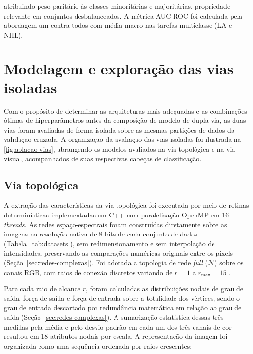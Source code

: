 atribuindo peso paritário às classes minoritárias e majoritárias, propriedade relevante em conjuntos desbalanceados. A métrica AUC-ROC foi calculada pela abordagem um-contra-todos com média macro nas tarefas multiclasse (LA e NHL).

\section{Modelagem e exploração das vias isoladas}
\label{sec:vias-isoladas}

Com o propósito de determinar as arquiteturas mais adequadas e as combinações ótimas de hiperparâmetros antes da composição do modelo de dupla via, as duas vias foram avaliadas de forma isolada sobre as mesmas partições de dados da validação cruzada. A organização da avaliação das vias isoladas foi ilustrada na \ref{fig:ablacao-vias}, abrangendo os modelos avaliados na via topológica e na via visual, acompanhados de suas respectivas cabeças de classificação.



\subsection{Via topológica}
\label{subsec:via-topologica}
\label{subsec:ext-tex}

A extração das características da via topológica foi executada por meio de rotinas determinísticas implementadas em C++ com paralelização OpenMP em 16 \textit{threads}. As redes espaço-espectrais foram construídas diretamente sobre as imagens na resolução nativa de 8 bits de cada conjunto de dados (Tabela~\ref{tab:datasets}), sem redimensionamento e sem interpolação de intensidades, preservando as comparações numéricas originais entre os pixels (Seção~\ref{sec:redes-complexas}). Foi adotada a topologia de rede \textit{full} ($\mathcal{N}$) sobre os canais RGB, com raios de conexão discretos variando de $r = 1$ a $r_{\max} = 15$ \cite{Scabini_2020}.

Para cada raio de alcance $r$, foram calculadas as distribuições nodais de grau de saída, força de saída e força de entrada sobre a totalidade dos vértices, sendo o grau de entrada descartado por redundância matemática em relação ao grau de saída (Seção~\ref{sec:redes-complexas}). A sumarização estatística dessas três medidas pela média e pelo desvio padrão em cada um dos três canais de cor resultou em 18 atributos nodais por escala. A representação da imagem foi organizada como uma sequência ordenada por raios crescentes:

